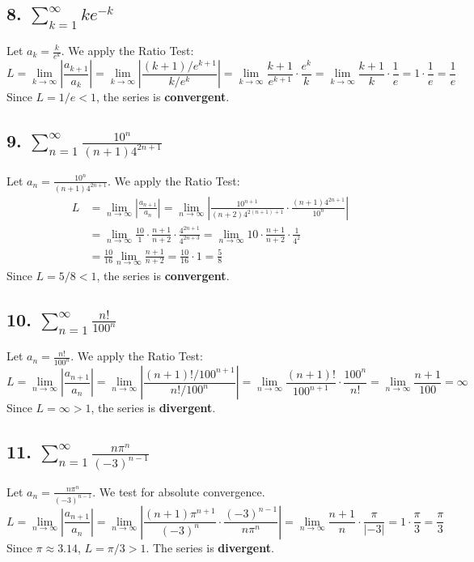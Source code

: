 \documentclass{article}
\begin{document}
\subsection*{8. $\sum_{k=1}^{\infty} ke^{-k}$}
Let $a_k = \frac{k}{e^k}$. We apply the Ratio Test:
\[ L = \lim_{k \to \infty} \left| \frac{a_{k+1}}{a_k} \right| = \lim_{k \to \infty} \left| \frac{(k+1)/e^{k+1}}{k/e^k} \right| = \lim_{k \to \infty} \frac{k+1}{e^{k+1}} \cdot \frac{e^k}{k} = \lim_{k \to \infty} \frac{k+1}{k} \cdot \frac{1}{e} = 1 \cdot \frac{1}{e} = \frac{1}{e} \]
Since $L = 1/e < 1$, the series is \textbf{convergent}.

\subsection*{9. $\sum_{n=1}^{\infty} \frac{10^n}{(n+1)4^{2n+1}}$}
Let $a_n = \frac{10^n}{(n+1)4^{2n+1}}$. We apply the Ratio Test:
\begin{align*}
L &= \lim_{n \to \infty} \left| \frac{a_{n+1}}{a_n} \right| = \lim_{n \to \infty} \left| \frac{10^{n+1}}{(n+2)4^{2(n+1)+1}} \cdot \frac{(n+1)4^{2n+1}}{10^n} \right| \\
&= \lim_{n \to \infty} \frac{10}{1} \cdot \frac{n+1}{n+2} \cdot \frac{4^{2n+1}}{4^{2n+3}} = \lim_{n \to \infty} 10 \cdot \frac{n+1}{n+2} \cdot \frac{1}{4^2} \\
&= \frac{10}{16} \lim_{n \to \infty} \frac{n+1}{n+2} = \frac{10}{16} \cdot 1 = \frac{5}{8}
\end{align*}
Since $L = 5/8 < 1$, the series is \textbf{convergent}.

\subsection*{10. $\sum_{n=1}^{\infty} \frac{n!}{100^n}$}
Let $a_n = \frac{n!}{100^n}$. We apply the Ratio Test:
\[ L = \lim_{n \to \infty} \left| \frac{a_{n+1}}{a_n} \right| = \lim_{n \to \infty} \left| \frac{(n+1)!/100^{n+1}}{n!/100^n} \right| = \lim_{n \to \infty} \frac{(n+1)!}{100^{n+1}} \cdot \frac{100^n}{n!} = \lim_{n \to \infty} \frac{n+1}{100} = \infty \]
Since $L = \infty > 1$, the series is \textbf{divergent}.

\subsection*{11. $\sum_{n=1}^{\infty} \frac{n\pi^n}{(-3)^{n-1}}$}
Let $a_n = \frac{n\pi^n}{(-3)^{n-1}}$. We test for absolute convergence.
\[ L = \lim_{n \to \infty} \left| \frac{a_{n+1}}{a_n} \right| = \lim_{n \to \infty} \left| \frac{(n+1)\pi^{n+1}}{(-3)^n} \cdot \frac{(-3)^{n-1}}{n\pi^n} \right| = \lim_{n \to \infty} \frac{n+1}{n} \cdot \frac{\pi}{|-3|} = 1 \cdot \frac{\pi}{3} = \frac{\pi}{3} \]
Since $\pi \approx 3.14$, $L = \pi/3 > 1$. The series is \textbf{divergent}.
\end{document}
